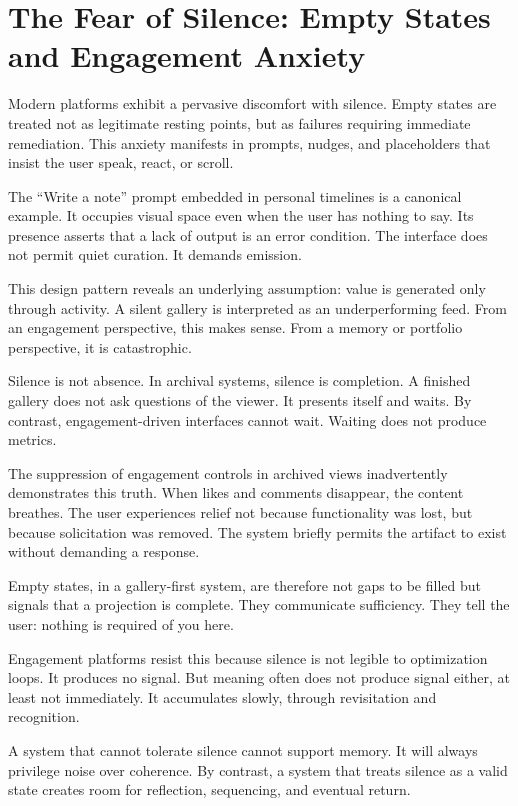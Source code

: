 \documentclass[11pt,oneside]{article}
\begin{document}
\section{The Fear of Silence: Empty States and Engagement Anxiety}

Modern platforms exhibit a pervasive discomfort with silence. Empty states are treated not as legitimate resting points, but as failures requiring immediate remediation. This anxiety manifests in prompts, nudges, and placeholders that insist the user speak, react, or scroll.

The “Write a note” prompt embedded in personal timelines is a canonical example. It occupies visual space even when the user has nothing to say. Its presence asserts that a lack of output is an error condition. The interface does not permit quiet curation. It demands emission.

This design pattern reveals an underlying assumption: value is generated only through activity. A silent gallery is interpreted as an underperforming feed. From an engagement perspective, this makes sense. From a memory or portfolio perspective, it is catastrophic.

Silence is not absence. In archival systems, silence is completion. A finished gallery does not ask questions of the viewer. It presents itself and waits. By contrast, engagement-driven interfaces cannot wait. Waiting does not produce metrics.

The suppression of engagement controls in archived views inadvertently demonstrates this truth. When likes and comments disappear, the content breathes. The user experiences relief not because functionality was lost, but because solicitation was removed. The system briefly permits the artifact to exist without demanding a response.

Empty states, in a gallery-first system, are therefore not gaps to be filled but signals that a projection is complete. They communicate sufficiency. They tell the user: nothing is required of you here.

Engagement platforms resist this because silence is not legible to optimization loops. It produces no signal. But meaning often does not produce signal either, at least not immediately. It accumulates slowly, through revisitation and recognition.

A system that cannot tolerate silence cannot support memory. It will always privilege noise over coherence. By contrast, a system that treats silence as a valid state creates room for reflection, sequencing, and eventual return.
\end{document}

